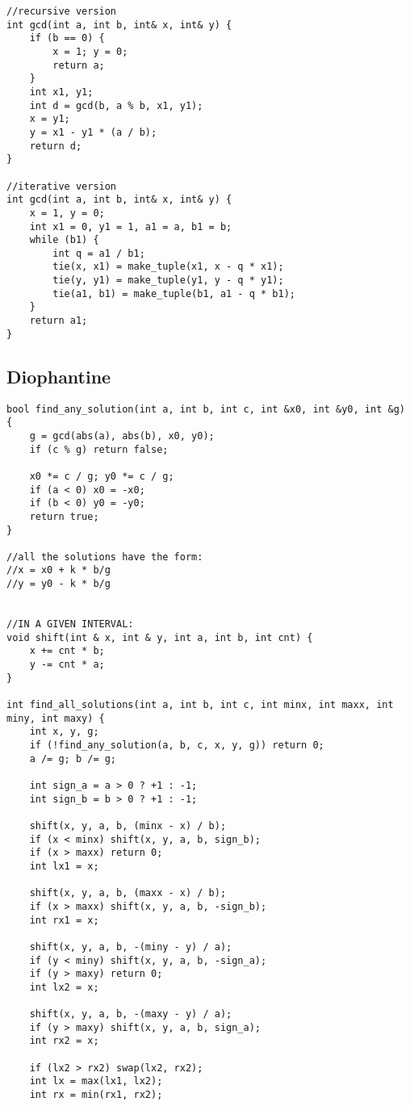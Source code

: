 \documentclass[11pt,a4paper]{article}
\begin{document}
\begin{multicols*}{2}
\begin{lstlisting}
//recursive version
int gcd(int a, int b, int& x, int& y) {
    if (b == 0) {
        x = 1; y = 0;
        return a;
    }
    int x1, y1;
    int d = gcd(b, a % b, x1, y1);
    x = y1;
    y = x1 - y1 * (a / b);
    return d;
}

//iterative version
int gcd(int a, int b, int& x, int& y) {
    x = 1, y = 0;
    int x1 = 0, y1 = 1, a1 = a, b1 = b;
    while (b1) {
        int q = a1 / b1;
        tie(x, x1) = make_tuple(x1, x - q * x1);
        tie(y, y1) = make_tuple(y1, y - q * y1);
        tie(a1, b1) = make_tuple(b1, a1 - q * b1);
    }
    return a1;
}
\end{lstlisting}

\subsection{Diophantine}
\begin{lstlisting}
bool find_any_solution(int a, int b, int c, int &x0, int &y0, int &g) {
    g = gcd(abs(a), abs(b), x0, y0);
    if (c % g) return false;

    x0 *= c / g; y0 *= c / g;
    if (a < 0) x0 = -x0;
    if (b < 0) y0 = -y0;
    return true;
}

//all the solutions have the form:
//x = x0 + k * b/g
//y = y0 - k * b/g


//IN A GIVEN INTERVAL:
void shift(int & x, int & y, int a, int b, int cnt) {
    x += cnt * b;
    y -= cnt * a;
}

int find_all_solutions(int a, int b, int c, int minx, int maxx, int miny, int maxy) {
    int x, y, g;
    if (!find_any_solution(a, b, c, x, y, g)) return 0;
    a /= g; b /= g;

    int sign_a = a > 0 ? +1 : -1;
    int sign_b = b > 0 ? +1 : -1;

    shift(x, y, a, b, (minx - x) / b);
    if (x < minx) shift(x, y, a, b, sign_b);
    if (x > maxx) return 0;
    int lx1 = x;

    shift(x, y, a, b, (maxx - x) / b);
    if (x > maxx) shift(x, y, a, b, -sign_b);
    int rx1 = x;

    shift(x, y, a, b, -(miny - y) / a);
    if (y < miny) shift(x, y, a, b, -sign_a);
    if (y > maxy) return 0;
    int lx2 = x;

    shift(x, y, a, b, -(maxy - y) / a);
    if (y > maxy) shift(x, y, a, b, sign_a);
    int rx2 = x;

    if (lx2 > rx2) swap(lx2, rx2);
    int lx = max(lx1, lx2);
    int rx = min(rx1, rx2);


\end{lstlisting}
\end{multicols*}
\end{document}
